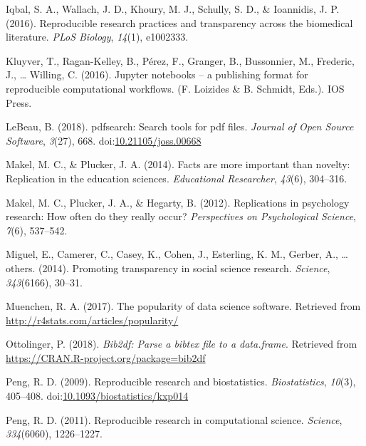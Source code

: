 \documentclass[
  english,
  ,man]{apa6}
\begin{document}
\leavevmode\hypertarget{ref-iqbal2016}{}%
Iqbal, S. A., Wallach, J. D., Khoury, M. J., Schully, S. D., \& Ioannidis, J. P. (2016). Reproducible research practices and transparency across the biomedical literature. \emph{PLoS Biology}, \emph{14}(1), e1002333.

\leavevmode\hypertarget{ref-kluyver2016}{}%
Kluyver, T., Ragan-Kelley, B., Pérez, F., Granger, B., Bussonnier, M., Frederic, J., \ldots{} Willing, C. (2016). Jupyter notebooks -- a publishing format for reproducible computational workflows. (F. Loizides \& B. Schmidt, Eds.). IOS Press.

\leavevmode\hypertarget{ref-pdfsearch}{}%
LeBeau, B. (2018). pdfsearch: Search tools for pdf files. \emph{Journal of Open Source Software}, \emph{3}(27), 668. doi:\href{https://doi.org/10.21105/joss.00668}{10.21105/joss.00668}

\leavevmode\hypertarget{ref-makel2014}{}%
Makel, M. C., \& Plucker, J. A. (2014). Facts are more important than novelty: Replication in the education sciences. \emph{Educational Researcher}, \emph{43}(6), 304--316.

\leavevmode\hypertarget{ref-makel2012}{}%
Makel, M. C., Plucker, J. A., \& Hegarty, B. (2012). Replications in psychology research: How often do they really occur? \emph{Perspectives on Psychological Science}, \emph{7}(6), 537--542.

\leavevmode\hypertarget{ref-miguel2014}{}%
Miguel, E., Camerer, C., Casey, K., Cohen, J., Esterling, K. M., Gerber, A., \ldots{} others. (2014). Promoting transparency in social science research. \emph{Science}, \emph{343}(6166), 30--31.

\leavevmode\hypertarget{ref-muenchen}{}%
Muenchen, R. A. (2017). The popularity of data science software. Retrieved from \url{http://r4stats.com/articles/popularity/}

\leavevmode\hypertarget{ref-bib2df}{}%
Ottolinger, P. (2018). \emph{Bib2df: Parse a bibtex file to a data.frame}. Retrieved from \url{https://CRAN.R-project.org/package=bib2df}

\leavevmode\hypertarget{ref-peng2009}{}%
Peng, R. D. (2009). Reproducible research and biostatistics. \emph{Biostatistics}, \emph{10}(3), 405--408. doi:\href{https://doi.org/10.1093/biostatistics/kxp014}{10.1093/biostatistics/kxp014}

\leavevmode\hypertarget{ref-peng2011}{}%
Peng, R. D. (2011). Reproducible research in computational science. \emph{Science}, \emph{334}(6060), 1226--1227.
\end{document}
